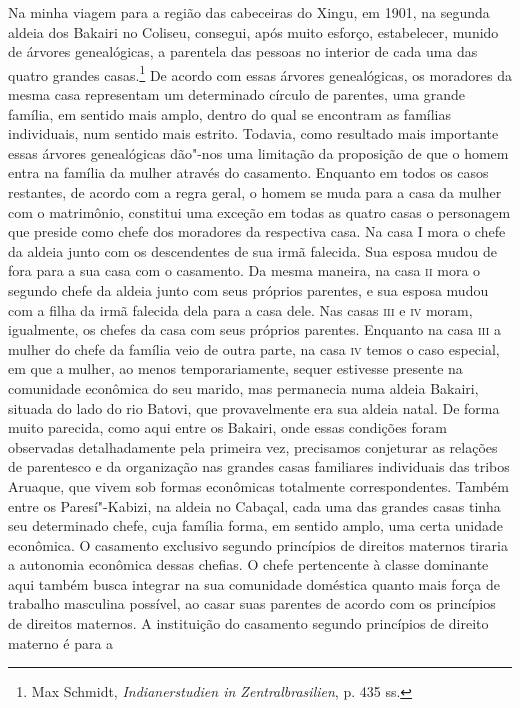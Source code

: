 Na minha viagem para a região das cabeceiras do Xingu, em 1901, na
segunda aldeia dos Bakairi no Coliseu, consegui, após muito esforço,
estabelecer, munido de árvores genealógicas, a parentela das pessoas no
interior de cada uma das quatro grandes casas.\footnote{Max Schmidt,
  \emph{Indianerstudien in Zentralbrasilien}, p. 435 ss.} De acordo com
essas árvores genealógicas, os moradores da mesma casa representam um
determinado círculo de parentes, uma grande família, em sentido mais
amplo, dentro do qual se encontram as famílias individuais, num sentido
mais estrito. Todavia, como resultado mais importante essas árvores
genealógicas dão"-nos uma limitação da proposição de que o homem entra
na família da mulher através do casamento. Enquanto em todos os casos
restantes, de acordo com a regra geral, o homem se muda para a casa da
mulher com o matrimônio, constitui uma exceção em todas as quatro casas
o personagem que preside como chefe dos moradores da respectiva casa. Na
casa I mora o chefe da aldeia junto com os descendentes de sua irmã
falecida. Sua esposa mudou de fora para a sua casa com o casamento. Da
mesma maneira, na casa \textsc{ii} mora o segundo chefe da aldeia junto com seus
próprios parentes, e sua esposa mudou com a filha da irmã falecida dela
para a casa dele. Nas casas \textsc{iii} e \textsc{iv} moram, igualmente, os chefes da
casa com seus próprios parentes. Enquanto na casa \textsc{iii} a mulher do chefe
da família veio de outra parte, na casa \textsc{iv} temos o caso especial, em que
a mulher, ao menos temporariamente, sequer estivesse presente na
comunidade econômica do seu marido, mas permanecia numa aldeia Bakairi,
situada do lado do rio Batovi, que provavelmente era sua aldeia natal.
De forma muito parecida, como aqui entre os Bakairi, onde essas
condições foram observadas detalhadamente pela primeira vez, precisamos
conjeturar as relações de parentesco e da organização nas grandes casas
familiares individuais das tribos Aruaque, que vivem sob formas
econômicas totalmente correspondentes. Também entre os Paresí"-Kabizi, na
aldeia no Cabaçal, cada uma das grandes casas tinha seu determinado
chefe, cuja família forma, em sentido amplo, uma certa unidade
econômica. O casamento exclusivo segundo princípios de direitos maternos
tiraria a autonomia econômica dessas chefias. O chefe pertencente à
classe dominante aqui também busca integrar na sua comunidade doméstica
quanto mais força de trabalho masculina possível, ao casar suas
parentes de acordo com os princípios de direitos maternos. A
instituição do casamento segundo princípios de direito materno é para a
